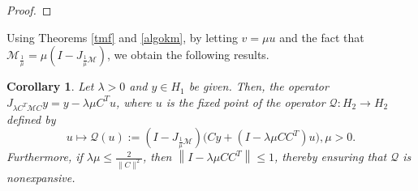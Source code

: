 \documentclass[11pt]{article}
\theoremstyle{plain}
\newtheorem{remark}{Remark}
\newtheorem{corollary}[theorem]{Corollary}
\begin{document}
{\begin{proof}
\end{proof}

Using Theorems \ref{tmf} and \ref{algokm},  by letting $v=\mu u$ and the fact that $\mathcal{M}_{\frac{1}{\mu}}=\mu  (I - J_{\frac{1}{\mu} \mathcal{M}})$, we obtain the following results.

\begin{corollary}\label{algo2n}
Let $\lambda > 0$ and $y \in H_1$ be given. Then, the operator $J_{\lambda C^T \mathcal{M} C} y=y - \lambda \mu C^T u$, where $u$ is the fixed point of the operator $\mathcal{Q}:H_2\to H_2$ defined by
$$u\mapsto\mathcal{Q}(u) :=  (I - J_{\frac{1}{\mu} \mathcal{M}}) \Big(Cy + ( I - \lambda \mu CC^T) u\Big), \mu>0.$$
 Furthermore, if ${\lambda}{\mu} \leq \frac{2}{\|C\|^2}$, then $\left\|I - {\lambda}{\mu} CC^T\right\| \leq 1$, thereby ensuring that $\mathcal{Q}$ is {nonexpansive}.
\end{corollary}

}
\end{document}

